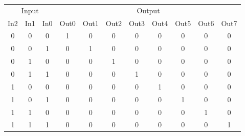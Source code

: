 \documentclass{standalone}
\begin{document}
	\begin{tabular}{@{} ccccccccccc @{}}
	\toprule
		\multicolumn{3}{c}{Input} & \multicolumn{8}{c}{Output} \\
	\cmidrule(r){1-3} \cmidrule(l){4-11}
		In2 & In1 & In0 & Out0 & Out1 & Out2 & Out3 & Out4 & Out5 & Out6 & Out7 \\
	\cmidrule(r){1-3} \cmidrule(l){4-11}
		0 & 0 & 0 & 1 & 0 & 0 & 0 & 0 & 0 & 0 & 0 \\
		0 & 0 & 1 & 0 & 1 & 0 & 0 & 0 & 0 & 0 & 0 \\
		0 & 1 & 0 & 0 & 0 & 1 & 0 & 0 & 0 & 0 & 0 \\
		0 & 1 & 1 & 0 & 0 & 0 & 1 & 0 & 0 & 0 & 0 \\
		1 & 0 & 0 & 0 & 0 & 0 & 0 & 1 & 0 & 0 & 0 \\
		1 & 0 & 1 & 0 & 0 & 0 & 0 & 0 & 1 & 0 & 0 \\
		1 & 1 & 0 & 0 & 0 & 0 & 0 & 0 & 0 & 1 & 0 \\
		1 & 1 & 1 & 0 & 0 & 0 & 0 & 0 & 0 & 0 & 1 \\
	\bottomrule
	\end{tabular}
\end{document}
